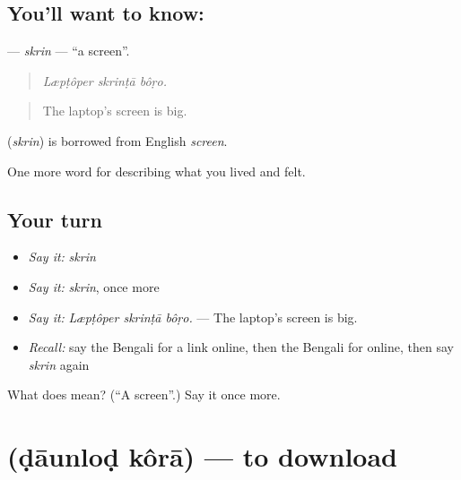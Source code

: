 \subsection*{You'll want to know: }
\textbf{} — \emph{skrin} — \textquotedblleft{}a screen\textquotedblright{}.

\begin{quote}
  
\end{quote}

\begin{quote}
\emph{Læpṭôper skrinṭā bôṛo.}
\end{quote}

\begin{quote}
The laptop's screen is big.
\end{quote}

\begin{cousinweb}
\textbf{} (\emph{skrin}) is borrowed from English \emph{screen}.
\end{cousinweb}

\begin{grammarlens}[title={What you've built}]
One more word for describing what you lived and felt.
\end{grammarlens}

\subsection*{Your turn}
\begin{itemize}
\raggedright
  \item \emph{Say it:} \emph{skrin}
  \item \emph{Say it:} \emph{skrin}, once more
  \item \emph{Say it:} \emph{Læpṭôper skrinṭā bôṛo.} — The laptop's screen is big.
  \item \emph{Recall:} say the Bengali for a link online, then the Bengali for online, then say \emph{skrin} again
\end{itemize}

\begin{tcolorbox}[breakable,colback=teal!4,colframe=teal!35!black,title={Before you move on}]
What does  mean? (\textquotedblleft{}A screen\textquotedblright{}.) Say it once more.
\end{tcolorbox}
\section[\texorpdfstring{\bn{ডাউনলোড} \bn{করা} (ḍāunloḍ kôrā)}{ডাউনলোড করা (ḍāunloḍ kôrā)}]{  (ḍāunloḍ kôrā) — to download}

